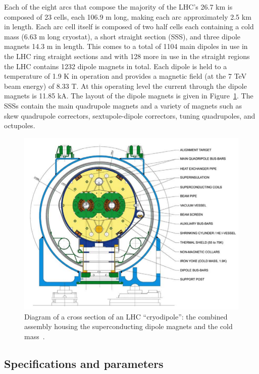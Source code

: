 Each of the eight arcs that compose the majority of the LHC's 26.7 km is composed of 23 cells, each 106.9 m long, making each arc approximately 2.5 km in length.  Each arc cell itself is composed of two half cells each containing a cold mass (6.63 m long cryostat), a short straight section (SSS), and three dipole magnets 14.3 m in length.  This comes to a total of 1104 main dipoles in use in the LHC ring straight sections and with 128 more in use in the straight regions the LHC contains 1232 dipole magnets in total.  Each dipole is held to a temperature of 1.9 K in operation and provides a magnetic field (at the 7 TeV beam energy) of 8.33 T.  At this operating level the current through the dipole magnets is 11.85 kA.  The layout of the dipole magnets is given in Figure~\ref{figapp:LHCdipole}.  The SSSs contain the main quadrupole magnets and a variety of magnets such as skew quadrupole correctors, sextupole-dipole correctors, tuning quadrupoles, and octupoles.  


\begin{figure}[!Hh]
       \centering
       \includegraphics[scale=0.5]{Figures/LHCdipole.png} 
       \caption[Diagram of an LHC cryodipole.]{Diagram of a cross section of an LHC ``cryodipole'': the combined assembly housing the superconducting dipole magnets and the cold mass~\cite{LHCmachine}.}
\label{figapp:LHCdipole}
\end{figure}


\subsection{Specifications and parameters}


